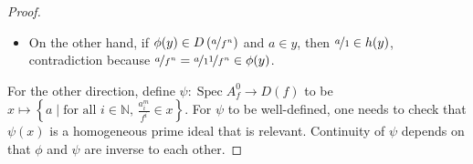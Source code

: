 \documentclass[a4paper,UKenglish,cleveref, autoref, thm-restate]{lipics-v2021}
\begin{document}
\begin{proof}
\begin{itemize}
            \item On the other hand, if $\phi(y)\in D\left(\nicefrac a{f^n}\right)$ and $a\in y$, then $\nicefrac a 1\in h(y)$, contradiction because $\nicefrac a{f^n}=\nicefrac a1\nicefrac1{f^n}\in \phi(y)$.
        \end{itemize}
    For the other direction, define $\psi: \operatorname{Spec} A^0_f\to{D(f)}$ to be $x \mapsto \left\{a\mid\text{for all $i\in\mathbb N$, $\frac{a_i^m}{f^i}\in x$}\right\}$. 
    For $\psi$ to be well-defined, one needs to check that $\psi(x)$ is a homogeneous prime ideal that is relevant. Continuity of $\psi$ depends on that $\phi$ and $\psi$ are inverse to each other.

\end{proof}
\end{document}
